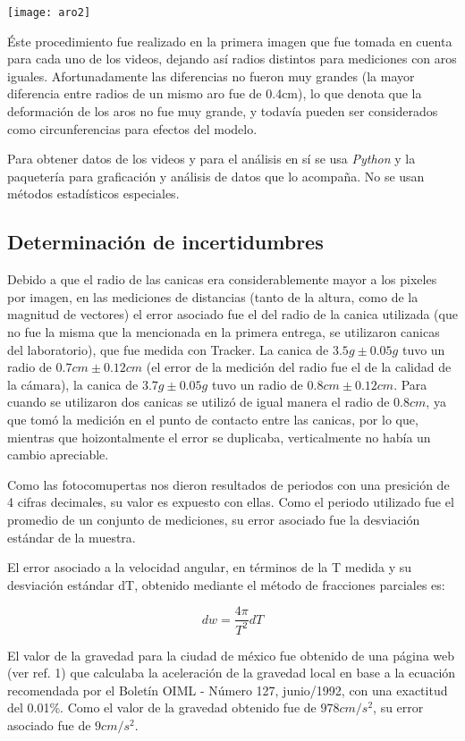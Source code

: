 \documentclass[12p]{article}
\begin{document}
\texttt{[image: aro2]}

 Éste procedimiento fue realizado en la primera imagen que fue tomada en cuenta para cada uno de los videos, dejando así radios distintos para mediciones con aros iguales. Afortunadamente las diferencias no fueron muy grandes (la mayor diferencia entre radios de un mismo aro fue de 0.4cm), lo que denota que la deformación de los aros no fue muy grande, y todavía pueden ser considerados como circunferencias para efectos del modelo.

\par Para obtener datos de los videos  y para el análisis en sí se usa \emph{Python} y la paquetería para graficación y análisis de datos que lo acompaña. No se usan métodos estadísticos especiales.

\subsection{Determinación de incertidumbres}

Debido a que el radio de las canicas era considerablemente mayor a los pixeles por imagen, en las mediciones de distancias (tanto de la altura, como de la magnitud de vectores) el error asociado fue el del radio de la canica utilizada (que no fue la misma que la mencionada en la primera entrega, se utilizaron canicas del laboratorio), que fue medida con Tracker. La canica de $3.5g \pm 0.05g$ tuvo un radio de $0.7cm \pm 0.12cm$ (el error de la medición del radio fue el de la calidad de la cámara), la canica de $3.7g \pm 0.05g$ tuvo un radio de $0.8cm \pm 0.12cm$. Para cuando se utilizaron dos canicas se utilizó de igual manera el radio de $0.8cm$, ya que tomó la medición en el punto de contacto entre las canicas, por lo que, mientras que hoizontalmente el error se duplicaba, verticalmente no había un cambio apreciable.

Como las fotocomupertas nos dieron resultados de periodos con una presición de 4 cifras decimales, su valor es expuesto con ellas. Como el periodo utilizado fue el promedio de un conjunto de mediciones, su error asociado fue la desviación estándar de la muestra.

El error asociado a la velocidad angular, en términos de la T medida y su desviación estándar dT, obtenido mediante el método de fracciones parciales es:

$$dw=\frac{4\pi}{T^2}dT$$

El valor de la gravedad para la ciudad de méxico fue obtenido de una página web (ver ref. 1) que calculaba la aceleración de la gravedad local en base a la ecuación recomendada por el Boletín OIML - Número 127, junio/1992, con una exactitud del 0.01\%. Como el valor de la gravedad obtenido fue de $978cm/s^2$, su error asociado fue de $9cm/s^2$.
\end{document}
